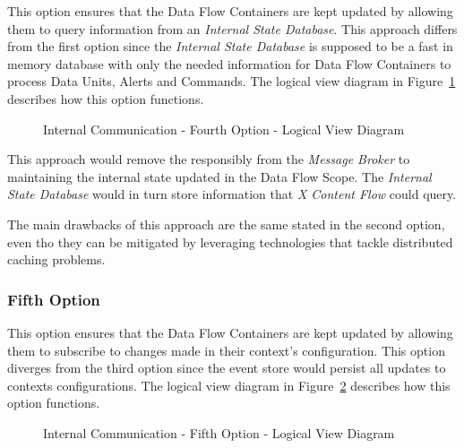 This option ensures that the Data Flow Containers are kept updated by allowing them to query information from an \textit{Internal State Database}. This approach differs from the first option since the \textit{Internal State Database} is supposed to be a fast in memory database with only the needed information for Data Flow Containers to process Data Units, Alerts and Commands. The logical view diagram in Figure~\ref{fig:design:alternatives:internal:fourth:diagram} describes how this option functions.

\begin{figure}[H]
   \centering
   \resizebox{\columnwidth}{!}
   {
      
   }
   \caption[Internal Communication - Fourth Option - Logical View Diagram]{Internal Communication - Fourth Option - Logical View Diagram}
   \label{fig:design:alternatives:internal:fourth:diagram}
\end{figure}

This approach would remove the responsibly from the \textit{Message Broker} to maintaining the internal state updated in the Data Flow Scope.
The \textit{Internal State Database} would in turn store information that \textit{X Content Flow} could query.

The main drawbacks of this approach are the same stated in the second option, even tho they can be mitigated by leveraging technologies that tackle distributed caching problems.

\subsubsection{Fifth Option}
\label{subsubsec:design:alternatives:internal:fifth}

This option ensures that the Data Flow Containers are kept updated by allowing them to subscribe to changes made in their context's configuration. This option diverges from the third option since the event store would persist all updates to contexts configurations. The logical view diagram in Figure~\ref{fig:design:alternatives:internal:fifth:diagram} describes how this option functions.

\begin{figure}[H]
   \centering
   \resizebox{\columnwidth}{!}
   {
      
   }
   \caption[Internal Communication - Fifth Option - Logical View Diagram]{Internal Communication - Fifth Option - Logical View Diagram}
   \label{fig:design:alternatives:internal:fifth:diagram}
\end{figure}


